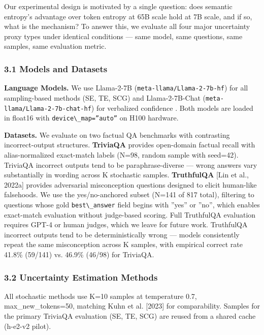 
Our experimental design is motivated by a single question: does semantic entropy's advantage over token entropy at 65B scale \citep{Kuhn2023Semantic} hold at 7B scale, and if so, what is the mechanism? To answer this, we evaluate all four major uncertainty proxy types under identical conditions --- same model, same questions, same samples, same evaluation metric.

\subsubsection{3.1 Models and Datasets}

\textbf{Language Models.} We use Llama-2-7B (\texttt{meta-llama/Llama-2-7b-hf}) for all sampling-based methods (SE, TE, SCG) and Llama-2-7B-Chat (\texttt{meta-llama/Llama-2-7b-chat-hf}) for verbalized confidence \citep{Touvron2023Llama}. Both models are loaded in float16 with \texttt{device\textbackslash \_map=''auto''} on H100 hardware.

\textbf{Datasets.} We evaluate on two factual QA benchmarks with contrasting incorrect-output structures. \textbf{TriviaQA} \citep{Joshi2017TriviaQA} provides open-domain factual recall with alias-normalized exact-match labels (N=98, random sample with seed=42). TriviaQA incorrect outputs tend to be paraphrase-diverse --- wrong answers vary substantially in wording across K stochastic samples. \textbf{TruthfulQA} [Lin et al., 2022a] provides adversarial misconception questions designed to elicit human-like falsehoods. We use the yes/no-anchored subset (N=141 of 817 total), filtering to questions whose gold \texttt{best\textbackslash \_answer} field begins with ''yes'' or ''no'', which enables exact-match evaluation without judge-based scoring. Full TruthfulQA evaluation requires GPT-4 or human judges, which we leave for future work. TruthfulQA incorrect outputs tend to be deterministically wrong --- models consistently repeat the same misconception across K samples, with empirical correct rate 41.8\% (59/141) vs. 46.9\% (46/98) for TriviaQA.

\subsubsection{3.2 Uncertainty Estimation Methods}

All stochastic methods use K=10 samples at temperature 0.7, max\_new\_tokens=50, matching Kuhn et al. [2023] for comparability. Samples for the primary TriviaQA evaluation (SE, TE, SCG) are reused from a shared cache (h-e2-v2 pilot).

